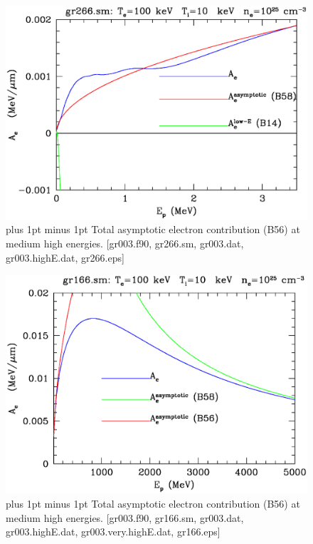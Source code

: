 \documentclass[preprint,12pt,eqsecnum,nofootinbib,amsmath,amssymb]{revtex4}
\newcommand{\footnoteskip}{\baselineskip 12pt plus 1pt minus 1pt}
\begin{document}
\pagebreak

\vskip-2cm 
\begin{figure}[h!]
\includegraphics[scale=0.45]{gr266.eps} 
\vskip-0.8cm 
\caption{\footnoteskip  
  Total asymptotic electron contribution (B56) at medium high
  energies.  [gr003.f90, gr266.sm, gr003.dat, 
  gr003.highE.dat, gr266.eps] 
}
\label{fig:gr266}
\end{figure}

\vskip-2cm 
\begin{figure}[h!]
\includegraphics[scale=0.45]{gr166.eps} 
\vskip-0.8cm 
\caption{\footnoteskip  
  Total asymptotic electron contribution (B56) at medium high
  energies.  [gr003.f90, gr166.sm, gr003.dat, 
  gr003.highE.dat, gr003.very.highE.dat, gr166.eps] 
}
\label{fig:gr166}
\end{figure}
\end{document}
